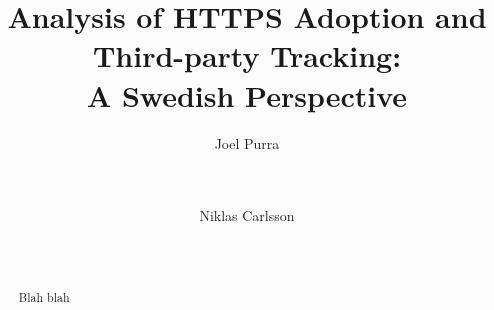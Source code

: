 \documentclass{sig-alternate-10pt}
\begin{document}
\title{Analysis of HTTPS Adoption and Third-party Tracking: \\A Swedish Perspective}

















\author{

\alignauthor Joel Purra\\

       \\

       \\


\and

\alignauthor Niklas Carlsson\\

       \\

       \\


}



\maketitle

\begin{abstract}



Blah blah



\end{abstract}
\end{document}
